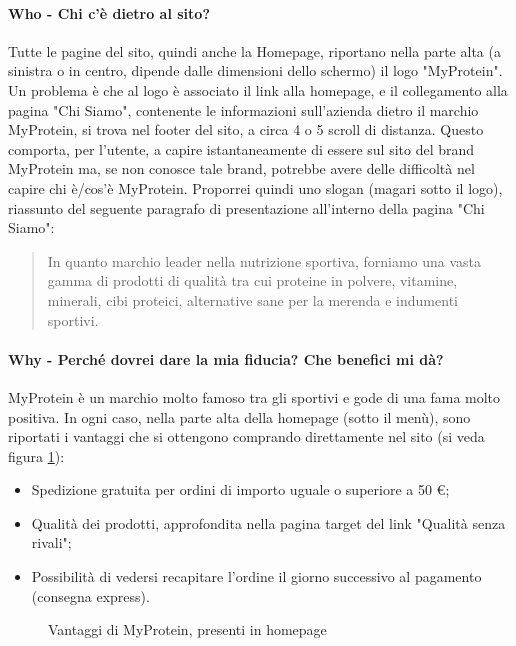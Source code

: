 \paragraph{Who - Chi c'è dietro al sito?}
Tutte le pagine del sito, quindi anche la Homepage, riportano nella parte alta (a sinistra o in centro, dipende dalle dimensioni dello schermo) il logo "MyProtein". Un problema è che al logo è associato il link alla homepage, e il collegamento alla pagina "Chi Siamo", contenente le informazioni sull'azienda dietro il marchio MyProtein, si trova nel footer del sito, a circa 4 o 5 scroll di distanza. Questo comporta, per l'utente, a capire istantaneamente di essere sul sito del brand MyProtein ma, se non conosce tale brand, potrebbe avere delle difficoltà nel capire chi è/cos'è MyProtein. Proporrei quindi uno slogan (magari sotto il logo), riassunto del seguente paragrafo di presentazione all'interno della pagina "Chi Siamo":
\begin{quote}
In quanto marchio leader nella nutrizione sportiva, forniamo una vasta gamma di prodotti di qualità tra cui proteine in polvere, vitamine, minerali, cibi proteici, alternative sane per la merenda e indumenti sportivi.
\end{quote}

\paragraph{Why - Perché dovrei dare la mia fiducia? Che benefici mi dà?}
MyProtein è un marchio molto famoso tra gli sportivi e gode di una fama molto positiva. In ogni caso, nella parte alta della homepage (sotto il menù), sono riportati i vantaggi che si ottengono comprando direttamente nel sito (si veda figura \ref{fig:figura2}):
\begin{itemize}
	\item Spedizione gratuita per ordini di importo uguale o superiore a 50 \euro;
	\item Qualità dei prodotti, approfondita nella pagina target del link "Qualità senza rivali";
	\item Possibilità di vedersi recapitare l'ordine il giorno successivo al pagamento (consegna express).
\end{itemize}
\begin{figure}[!htb]
	\caption{\label{fig:figura2} Vantaggi di MyProtein, presenti in homepage}
\end{figure}
